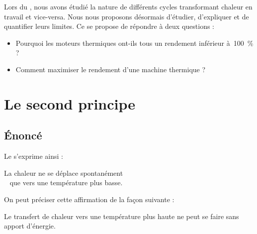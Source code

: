 
	Lors du \courssix, nous avons étudié la nature de différents cycles transformant chaleur en travail et vice-versa. Nous nous proposons désormais d’étudier, d’expliquer et de quantifier leurs limites. Ce \courssept se propose de répondre à deux questions :
	\begin{itemize}
		\item Pourquoi les moteurs thermiques ont-ils tous un rendement inférieur à~\SI{100}{\percent} ?
		\item Comment maximiser le rendement d’une machine thermique ?
	\end{itemize} \dontbreakpage \vspace{2em}


\section{Le second principe}



	\subsection{Énoncé}

		Le  s’exprime ainsi :

		\begin{principe}
		La chaleur ne se déplace spontanément\hspace{1ex} \\		
		\hspace{1ex} \  que vers une température plus basse.
		\end{principe}

		On peut préciser cette affirmation de la façon suivante :

		\begin{trucimportant}
		Le transfert de chaleur vers une température plus haute\linebreak
		ne peut se faire sans apport d’énergie.
		\end{trucimportant}

